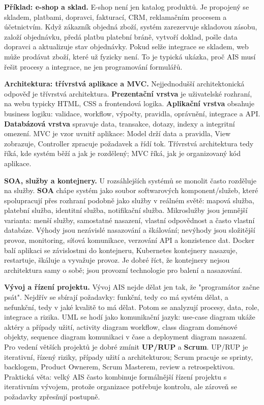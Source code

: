 \begin{greenbox}
\textbf{Příklad: e-shop a sklad.} E-shop není jen katalog produktů. Je propojený se skladem, platbami, dopravci, fakturací, CRM, reklamačním procesem a účetnictvím. Když zákazník objedná zboží, systém zarezervuje skladovou zásobu, založí objednávku, předá platbu platební bráně, vytvoří doklad, pošle data dopravci a aktualizuje stav objednávky. Pokud selže integrace se skladem, web může prodávat zboží, které už fyzicky není. To je typická ukázka, proč AIS musí řešit procesy a integrace, ne jen programování formulářů.

\textbf{Architektura: třívrstvá aplikace a MVC.} Nejjednodušší architektonická odpověď je třívrstvá architektura. \textbf{Prezentační vrstva} je uživatelské rozhraní, na webu typicky HTML, CSS a frontendová logika. \textbf{Aplikační vrstva} obsahuje business logiku: validace, workflow, výpočty, pravidla, oprávnění, integrace a API. \textbf{Databázová vrstva} spravuje data, transakce, dotazy, indexy a integritní omezení. MVC je vzor uvnitř aplikace: Model drží data a pravidla, View zobrazuje, Controller zpracuje požadavek a řídí tok. Třívrstvá architektura tedy říká, kde systém běží a jak je rozdělený; MVC říká, jak je organizovaný kód aplikace.

\textbf{SOA, služby a kontejnery.} U rozsáhlejších systémů se monolit často rozděluje na služby. \textbf{SOA} chápe systém jako soubor softwarových komponent/služeb, které spolupracují přes rozhraní podobně jako služby v reálném světě: mapová služba, platební služba, identitní služba, notifikační služba. Mikroslužby jsou jemnější varianta: menší služby, samostatné nasazení, vlastní odpovědnost a často vlastní databáze. Výhody jsou nezávislé nasazování a škálování; nevýhody jsou složitější provoz, monitoring, síťová komunikace, verzování API a konzistence dat. Docker balí aplikaci se závislostmi do kontejneru, Kubernetes kontejnery nasazuje, restartuje, škáluje a vyvažuje provoz. Je dobré říct, že kontejnery nejsou architektura samy o sobě; jsou provozní technologie pro balení a nasazování.

\textbf{Vývoj a řízení projektu.} Vývoj AIS nejde dělat jen tak, že "programátor začne psát". Nejdřív se sbírají požadavky: funkční, tedy co má systém dělat, a nefunkční, tedy v jaké kvalitě to má dělat. Potom se analyzují procesy, data, role, integrace a rizika. UML se hodí jako komunikační jazyk: use-case diagram ukáže aktéry a případy užití, activity diagram workflow, class diagram doménové objekty, sequence diagram komunikaci v čase a deployment diagram nasazení. Pro vedení větších projektů je dobré zmínit \textbf{UP/RUP} a \textbf{Scrum}. UP/RUP je iterativní, řízený riziky, případy užití a architekturou; Scrum pracuje se sprinty, backlogem, Product Ownerem, Scrum Masterem, review a retrospektivou. Praktická věta: velký AIS často kombinuje formálnější řízení projektu s iterativním vývojem, protože organizace potřebuje kontrolu, ale zároveň se požadavky zpřesňují postupně.


\end{greenbox}
